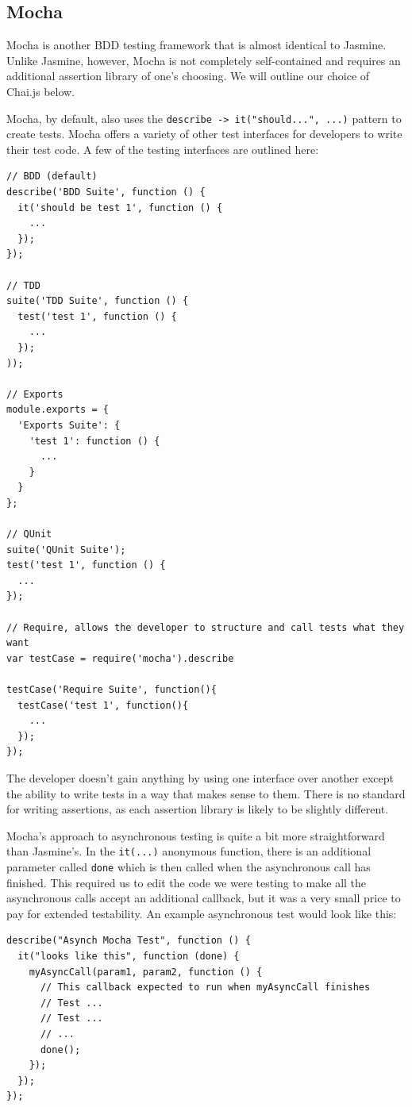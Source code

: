 \documentclass[12pt]{ucthesis}
\begin{document}
\subsection{Mocha}
Mocha \cite{Mocha} is another BDD testing framework that is almost identical to Jasmine. Unlike Jasmine, however, Mocha is not completely self-contained and requires an additional assertion library of one's choosing. We will outline our choice of Chai.js below.

Mocha, by default, also uses the \lstinline{describe -> it("should...", ...)} pattern to create tests. Mocha offers a variety of other test interfaces for developers to write their test code. A few of the testing interfaces are outlined here:
\begin{lstlisting}
// BDD (default)
describe('BDD Suite', function () {
  it('should be test 1', function () {
    ...
  });
});

// TDD
suite('TDD Suite', function () {
  test('test 1', function () {
    ...
  });
));

// Exports
module.exports = {
  'Exports Suite': {
    'test 1': function () {
      ...
    }
  }
};

// QUnit
suite('QUnit Suite');
test('test 1', function () {
  ...
});

// Require, allows the developer to structure and call tests what they want
var testCase = require('mocha').describe

testCase('Require Suite', function(){
  testCase('test 1', function(){
    ...
  });
});
\end{lstlisting}
The developer doesn't gain anything by using one interface over another except the ability to write tests in a way that makes sense to them. There is no standard for writing assertions, as each assertion library is likely to be slightly different.

Mocha's approach to asynchronous testing is quite a bit more straightforward than Jasmine's. In the \lstinline{it(...)} anonymous function, there is an additional parameter called \lstinline{done} which is then called when the asynchronous call has finished. This required us to edit the code we were testing to make all the asynchronous calls accept an additional callback, but it was a very small price to pay for extended testability. An example asynchronous test would look like this:
\begin{lstlisting}
describe("Asynch Mocha Test", function () {
  it("looks like this", function (done) {
    myAsyncCall(param1, param2, function () { 
      // This callback expected to run when myAsyncCall finishes
      // Test ...
      // Test ...
      // ...
      done();
    });
  });
});
\end{lstlisting}
\end{document}
